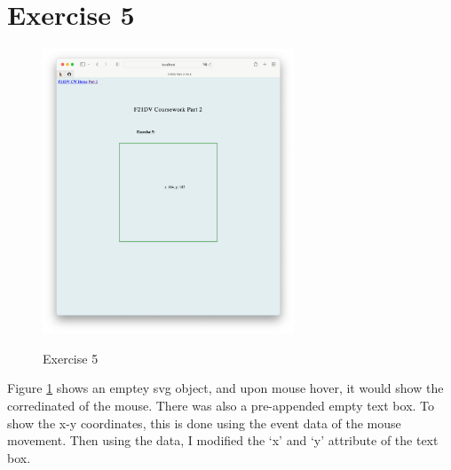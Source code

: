 \documentclass{scrreprt}
\begin{document}
\section{Exercise 5}
\begin{figure}[!ht]
    \centering
    \includegraphics[width = 7.5cm]{images/ex5.png}
    \label{fig:ex5}
    \caption{Exercise 5}
\end{figure}
\FloatBarrier
% 
Figure \ref{fig:ex5} shows an emptey svg object, and upon mouse hover, it would show the corredinated of the mouse. There was also a pre-appended empty text box. To show the x-y coordinates, this is done using the event data of the mouse movement. Then using the data, I modified the `x' and `y' attribute of the text box.

\newpage
\end{document}

